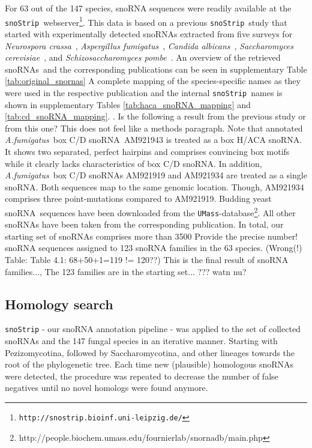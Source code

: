 \documentclass[preprint,3p,times,twocolumn]{elsarticle}
\newcommand{\JH}[1]{\begingroup\color{purple}#1\endgroup}
\newcommand{\SB}[1]{\begingroup\color{turquoise}#1\endgroup}
\newcommand{\url}[1]{\texttt{\small #1}}
\newcommand{\snos}{snoRNAs}
\newcommand{\sno}{snoRNA}
\newcommand{\cd}{box C/D snoRNA}
\newcommand{\haca}{box H/ACA snoRNA}
\newcommand{\snostrip}{\texttt{snoStrip}}
\newcommand{\afu}{\emph{A.fumigatus}}
\newcommand{\Afu}{\emph{Aspergillus fumigatus}}
\newcommand{\Calb}{\emph{Candida albicans}}
\newcommand{\Spo}{\emph{Schizosaccharomyces pombe}}
\newcommand{\Ncr}{\emph{Neurospora crassa}}
\newcommand{\Sce}{\emph{Saccharomyces cerevisiae}}
\begin{document}
For 63 out of the 147 species, snoRNA sequences were readily available at the \snostrip\ webserver\footnote{\url{http://snostrip.bioinf.uni-leipzig.de/}}. 
This data is based on a previous \snostrip\ study\cite{Bartschat:2014} that started with experimentally detected snoRNAs extracted from five surveys for \Ncr\ \citep{Liu:2009}, \Afu\ \citep{Joechl:2008}, \Calb\
\citep{Mitrovich:2010}, \Sce\ \citep{Piekna-Przybylska:2007}, and
\Spo\ \citep{Li:2005}. An overview of the retrieved \snos\ and the
corresponding publications can be seen in supplementary Table
\ref{tab:original_snornas} \SB{A complete mapping of the species-specific names as they were used in the respective publication and the internal \snostrip\ names is shown in supplementary Tables \ref{tab:haca_snoRNA_mapping} and \ref{tab:cd_snoRNA_mapping}. }. \JH{Is the following a result from the previous study \cite{Bartschat:2014} or from this one? This does not feel like a methods paragraph.} Note that annotated \afu\ \cd\  AM921943 is treated as a \haca.  It shows two separated,
perfect hairpins and comprises convincing box motifs while it clearly
lacks characteristics of \cd.  In addition, \afu\ \cd s AM921919 and AM921934 are treated as a single \sno. Both sequences map to the same genomic location. Though, AM921934 comprises three point-mutations compared to AM921919.
Budding yeast \sno\ sequences have been downloaded from the
\texttt{UMass}-database\footnote{http://people.biochem.umass.edu/fournierlab/snornadb/main.php}.
All other \sno s have been taken from the corresponding publication. In total, our starting set of snoRNAs comprises more than 3500 \JH{Provide the precise number!} snoRNA sequences assigned to 123 snoRNA families in the 63 species. \SB{(Wrong(!) Table: Table 4.1: 68+50+1=119 != 120??) This is the final result of snoRNA families..., The 123 families are in the starting set...} \JH{??? watn nu?}

\subsection{Homology search}

\snostrip\citep{Bartschat:2014} - our snoRNA annotation pipeline - was applied to the set of collected snoRNAs and the 147 fungal species in an iterative manner. Starting with Pezizomycotina, followed by Saccharomycotina, and other lineages towards the root of the phylogenetic tree. Each time new (plausible) homologous snoRNAs were detected, the procedure was repeated to decrease the number of false negatives until no novel homologs were found anymore.
\end{document}
